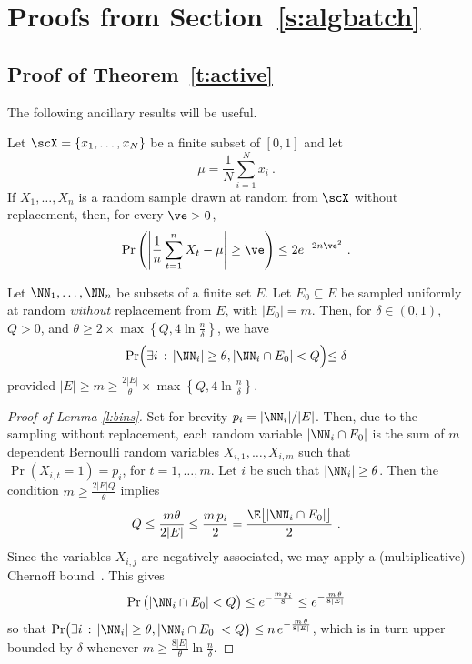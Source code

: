 \section{Proofs from Section~\ref{s:algbatch}}
\subsection{Proof of Theorem~\ref{t:active}}
The following ancillary results will be useful.
%
\begin{lemma}
\label{l:hoeff-wr}
Let $\scX = \{x_1,\dots,x_N\}$ be a finite subset of $[0,1]$ and let
\[
	\mu = \frac{1}{N}\sum_{i=1}^N x_i~.
\]
If $X_1,\dots,X_n$ is a random sample drawn at random from $\scX$ without replacement, then, for every $\ve > 0$,
\[
	\Pr\left( \left|\frac{1}{n}\sum_{t=1}^n X_t - \mu \right| \ge \ve \right) \le 2e^{-2n\ve^2}~.
\]
\end{lemma}
%
\begin{lemma}\label{l:bins}
Let $\NN_1, \ldots, \NN_n$ be subsets of a finite set $E$.
Let $E_0 \subseteq E$ be sampled uniformly at random {\em without} replacement from $E$, with $|E_0| = m$. Then, for $\delta \in (0,1)$, $Q > 0$, and $\theta \geq 2\times\max\left\{Q,4\ln \frac{n}{\delta}\right\}$, we have
\[
\Pr\Bigl( \exists i \,:\, |\NN_i| \geq \theta, |\NN_i \cap E_0| < Q\Bigl) \leq \delta
\]
provided $|E| \geq m \geq \frac{2|E|}{\theta}\times\max\left\{Q,4\ln \frac{n}{\delta}\right\}$.
\end{lemma}
%
\begin{proof}[Proof of Lemma \ref{l:bins}]
Set for brevity $p_i = |\NN_i|/|E|$. Then, due to the sampling without replacement, each random variable $|\NN_i \cap E_0|$ is the sum of $m$ dependent Bernoulli random variables $X_{i,1}, \ldots, X_{i,m}$ such that $\Pr(X_{i,t} = 1) = p_i$, for $t = 1, \ldots, m$. Let $i$ be such that $|\NN_i| \geq \theta$. Then the condition $m \geq \frac{2|E|Q}{\theta}$ implies
\[
Q \leq \frac{m\theta}{2|E|} \leq \frac{m\,p_i}{2} = \frac{\E\big[|\NN_i \cap E_0|\big]}{2}~.
\]
Since the variables $X_{i,j}$ are negatively associated, we may apply a (multiplicative) Chernoff bound~\cite[Section~3.1]{dpbook}.
This gives
\[
\Pr\big(|\NN_i \cap E_0| < Q\big) \leq e^{-\frac{m\,p_i}{8}} \leq e^{-\frac{m\,\theta}{8|E|}}
\]
so that
$
\Pr\bigl( \exists i\,:\, |\NN_i| \geq \theta, |\NN_i \cap E_0| < Q\bigr) \leq n\,e^{-\frac{m\,\theta}{8|E|}}
$,
which is in turn upper bounded by $\delta$ whenever 
$m \geq \frac{8|E|}{\theta}\ln \frac{n}{\delta}$. %
\end{proof}

